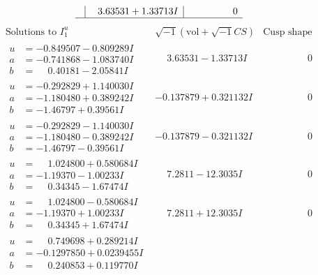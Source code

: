 \documentclass[1p]{elsarticle_modified}
\theoremstyle{definition}
\newcommand{\I}{\sqrt{-1}}
\begin{document}
$$\begin{array}{c|c|c}
 & \phantom{-}3.63531 + 1.33713 I & \phantom{-0.000000 } 0\\
 \hline 
 \end{array}$$\newpage$$\begin{array}{c|c|c}  
\text{Solutions to }I^u_{1}& \I (\text{vol} + \sqrt{-1}CS) & \text{Cusp shape}\\
 \hline 
\begin{aligned}
u &= -0.849507 - 0.809289 I \\
a &= -0.741868 - 1.083740 I \\
b &= \phantom{-}0.40181 - 2.05841 I\end{aligned}
 & \phantom{-}3.63531 - 1.33713 I & \phantom{-0.000000 } 0 \\ \hline\begin{aligned}
u &= -0.292829 + 1.140030 I \\
a &= -1.180480 + 0.389242 I \\
b &= -1.46797 + 0.39561 I\end{aligned}
 & -0.137879 + 0.321132 I & \phantom{-0.000000 } 0 \\ \hline\begin{aligned}
u &= -0.292829 - 1.140030 I \\
a &= -1.180480 - 0.389242 I \\
b &= -1.46797 - 0.39561 I\end{aligned}
 & -0.137879 - 0.321132 I & \phantom{-0.000000 } 0 \\ \hline\begin{aligned}
u &= \phantom{-}1.024800 + 0.580684 I \\
a &= -1.19370 - 1.00233 I \\
b &= \phantom{-}0.34345 - 1.67474 I\end{aligned}
 & \phantom{-}7.2811 - 12.3035 I & \phantom{-0.000000 } 0 \\ \hline\begin{aligned}
u &= \phantom{-}1.024800 - 0.580684 I \\
a &= -1.19370 + 1.00233 I \\
b &= \phantom{-}0.34345 + 1.67474 I\end{aligned}
 & \phantom{-}7.2811 + 12.3035 I & \phantom{-0.000000 } 0 \\ \hline\begin{aligned}
u &= \phantom{-}0.749698 + 0.289214 I \\
a &= -0.1297850 + 0.0239455 I \\
b &= \phantom{-}0.240853 + 0.119770 I\end{aligned}

\end{array}$$
\end{document}

